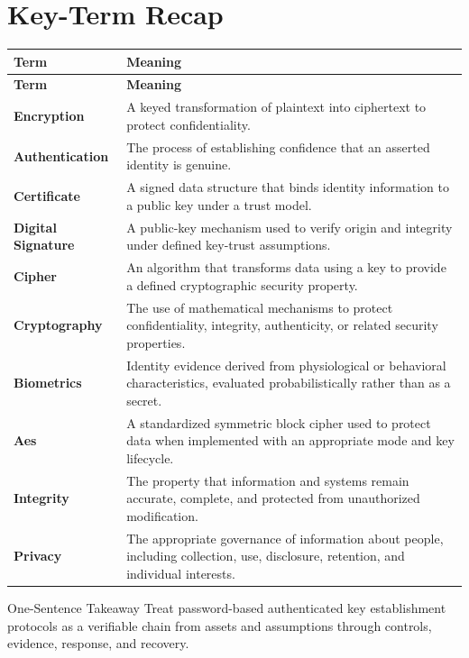 \documentclass[11pt,letterpaper]{article}
\begin{document}
\section*{Key-Term Recap}
\begin{longtable}{>{\RaggedRight\arraybackslash}p{}>{\RaggedRight\arraybackslash}p{}}
\toprule\rowcolor{Navy}\color{white}\textbf{Term} & \color{white}\textbf{Meaning}\\\midrule
\endfirsthead
\toprule\rowcolor{Navy}\color{white}\textbf{Term} & \color{white}\textbf{Meaning}\\\midrule
\endhead
\textbf{Encryption} & A keyed transformation of plaintext into ciphertext to protect confidentiality. \\\midrule
\textbf{Authentication} & The process of establishing confidence that an asserted identity is genuine. \\\midrule
\textbf{Certificate} & A signed data structure that binds identity information to a public key under a trust model. \\\midrule
\textbf{Digital Signature} & A public-key mechanism used to verify origin and integrity under defined key-trust assumptions. \\\midrule
\textbf{Cipher} & An algorithm that transforms data using a key to provide a defined cryptographic security property. \\\midrule
\textbf{Cryptography} & The use of mathematical mechanisms to protect confidentiality, integrity, authenticity, or related security properties. \\\midrule
\textbf{Biometrics} & Identity evidence derived from physiological or behavioral characteristics, evaluated probabilistically rather than as a secret. \\\midrule
\textbf{Aes} & A standardized symmetric block cipher used to protect data when implemented with an appropriate mode and key lifecycle. \\\midrule
\textbf{Integrity} & The property that information and systems remain accurate, complete, and protected from unauthorized modification. \\\midrule
\textbf{Privacy} & The appropriate governance of information about people, including collection, use, disclosure, retention, and individual interests. \\\midrule
\bottomrule
\end{longtable}
\begin{CornellExamBox}{One-Sentence Takeaway}
Treat password-based authenticated key establishment protocols as a verifiable chain from assets and assumptions through controls, evidence, response, and recovery.
\end{CornellExamBox}
\end{document}
